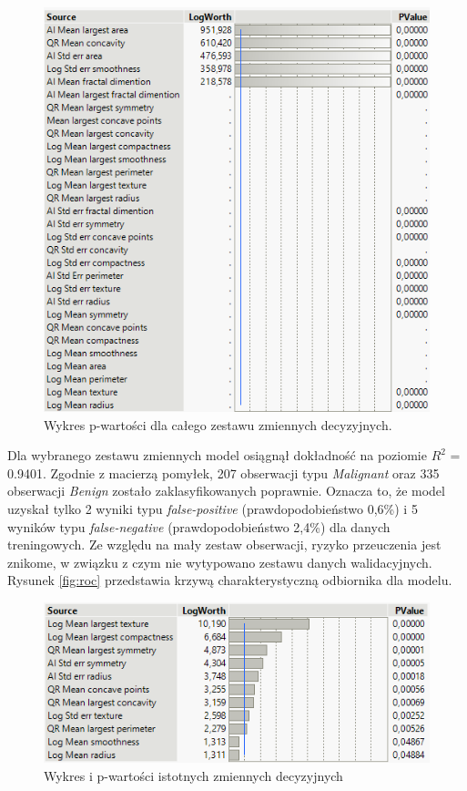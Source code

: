 \begin{figure}[!ht]
	\centering
	\includegraphics[width=0.9\linewidth]{Rysunki/Rozdzial3/pvalue1}
	\caption{Wykres p-wartości dla całego zestawu zmiennych decyzyjnych.}
	\label{fig:pvalue1}
\end{figure}

\newpage
Dla wybranego zestawu zmiennych model osiągnął dokładność na poziomie $R^{2}$ = 0.9401. Zgodnie z macierzą pomyłek, 207 obserwacji typu \textit{Malignant} oraz 335 obserwacji \textit{Benign} zostało zaklasyfikowanych poprawnie. Oznacza to, że model uzyskał tylko 2 wyniki typu \textit{false-positive} (prawdopodobieństwo 0,6\%) i 5 wyników typu \textit{false-negative} (prawdopodobieństwo 2,4\%) dla danych treningowych. Ze względu na mały zestaw obserwacji, ryzyko przeuczenia jest znikome, w związku z czym nie wytypowano zestawu danych walidacyjnych. Rysunek \ref{fig:roc} przedstawia krzywą charakterystyczną odbiornika dla modelu. 

\begin{figure}[!ht]
	\centering
	\includegraphics[width=0.7\linewidth]{Rysunki/Rozdzial3/pvalue2}
	\caption{Wykres i p-wartości istotnych zmiennych decyzyjnych}
	\label{fig:pvalue2}
\end{figure}

